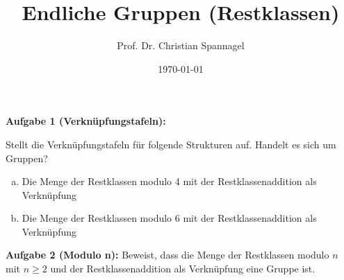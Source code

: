 \documentclass{cssheet}
\title{Endliche Gruppen (Restklassen)}
\author{Prof. Dr. Christian Spannagel}
\date{\today}
\begin{document}
	\printtitle

\vspace*{10mm}


\textbf{Aufgabe 1 (Verknüpfungstafeln):} 

Stellt die Verknüpfungstafeln für folgende Strukturen auf. Handelt es sich um Gruppen?
\begin{enumerate}[a)]
\item Die Menge der Restklassen modulo 4 mit der Restklassenaddition als Verknüpfung
\item Die Menge der Restklassen modulo 6 mit der Restklassenaddition als Verknüpfung
\end{enumerate}

\textbf{Aufgabe 2 (Modulo n):}  Beweist, dass die Menge der Restklassen modulo $n$ mit $n\geq 2$ und der Restklassenaddition als Verknüpfung eine Gruppe ist.


\vspace*{2cm}
\printlicense

\printsocials
\end{document}
